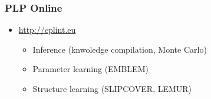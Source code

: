 \documentclass[trans]{beamer}
\begin{document}
%
\begin{frame}
  \frametitle{PLP Online}
\begin{itemize}
\item
\url{http://cplint.eu}
\begin{itemize}
\item Inference (knwoledge compilation, Monte Carlo)
\item Parameter learning (EMBLEM)
\item Structure learning (SLIPCOVER, LEMUR)
\end{itemize}
\end{itemize}
\end{frame}
\end{document}
